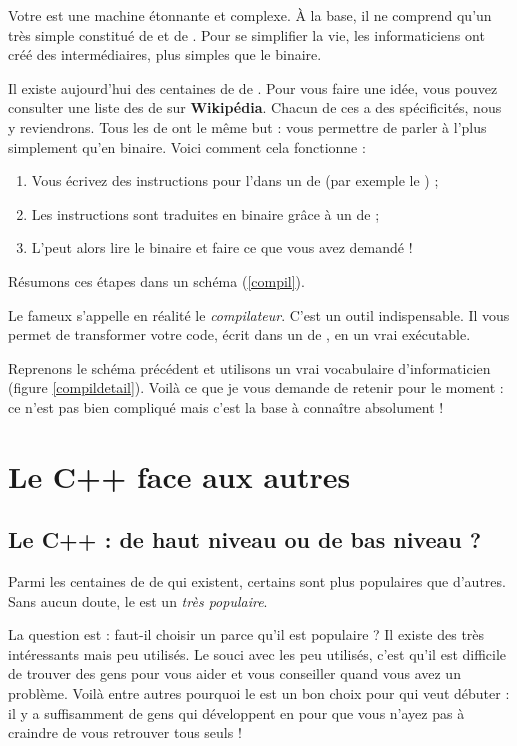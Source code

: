 Votre \ordi est une machine étonnante et complexe. À la base, il ne comprend qu'un \lang très simple constitué de  et de . 
Pour se simplifier la vie, les informaticiens ont créé des \langs intermédiaires, plus simples que le binaire.

 Il existe aujourd'hui des centaines de \langs de \progio. Pour vous faire une idée, vous pouvez consulter une liste des \langs de \progio sur \textbf{Wikipédia}. Chacun de ces \langs a des spécificités, nous y reviendrons.
Tous les \langs de \progio ont le même but : vous permettre de parler à l'\ordi plus simplement qu'en binaire. Voici comment cela fonctionne :

\begin{enumerate}
	\item Vous écrivez des instructions pour l'\ordi dans un \lang de \progio (par exemple le \cplus) ;
	\item Les instructions sont traduites en binaire grâce à un \prog de  ;
	\item L'\ordi peut alors lire le binaire et faire ce que vous avez demandé !
\end{enumerate}

Résumons ces étapes dans un schéma (\fig \ref{compil}).

Le fameux  s'appelle en réalité le \emph{compilateur}. C'est un outil indispensable. Il vous permet de transformer votre code, écrit dans un \lang de \progio, en un vrai \prog exécutable.

Reprenons le schéma précédent et utilisons un vrai vocabulaire d'informaticien (figure \ref{compildetail}).
Voilà ce que je vous demande de retenir pour le moment : ce n'est pas bien compliqué mais c'est la base à connaître absolument !


\section{Le C++ face aux autres \langs}
\subsection{Le C++ : \lang de haut niveau ou de bas niveau ?}
Parmi les centaines de \langs de \progio qui existent, certains sont plus populaires que d'autres. Sans aucun doute, le \cplus est un \lang \emph{très populaire}.

La question est : faut-il choisir un \lang parce qu'il est populaire ? Il existe des \langs très intéressants mais peu utilisés. Le souci avec les \langs peu utilisés, c'est qu'il est difficile de trouver des gens pour vous aider et vous conseiller quand vous avez un problème. Voilà entre autres pourquoi le \cplus est un bon choix pour qui veut débuter : il y a suffisamment de gens qui développent en \cplus pour que vous n'ayez pas à craindre de vous retrouver tous seuls !

